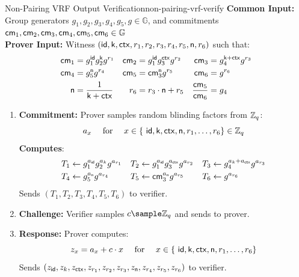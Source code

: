 \begin{protocol}{Non-Pairing VRF Output Verification}{non-pairing-vrf-verify}\label{pok-non-pairing-vrf}
\textbf{Common Input:} Group generators $g_1, g_2, g_3, g_4, g_5, g \in \mathbb{G}$, and commitments $\mathsf{cm}_1, \mathsf{cm}_2, \mathsf{cm}_3, \mathsf{cm}_4, \mathsf{cm}_5, \mathsf{cm}_6 \in \mathbb{G}$\\
\textbf{Prover Input:} Witness $(\mathsf{id}, \mathsf{k}, \mathsf{ctx}, r_1, r_2, r_3, r_4, r_5, \textsf{n}, r_6)$ such that:
    \begin{align*}
        \mathsf{cm}_1 &= g_1^{\mathsf{id}} g_2^{\mathsf{k}} g^{r_1}     &    \mathsf{cm}_2 &= g_1^{\mathsf{id}} g_3^{\mathsf{ctx}} g^{r_2}  &   \mathsf{cm}_3 &= g_4^{\mathsf{k} + \mathsf{ctx}} g^{r_3}\\
        \mathsf{cm}_4 &= g_5^{\textsf{n}} g^{r_4}   &   \mathsf{cm}_5 &= \mathsf{cm}_3^{\textsf{n}} g^{r_5}     &   \mathsf{cm}_6 &= g^{r_6} \\
        \textsf{n} &= \frac{1}{\mathsf{k} + \mathsf{ctx}}   &   r_6 &= r_3 \cdot \textsf{n} + r_5    &   \frac{\mathsf{cm}_5}{\mathsf{cm}_6} &= g_4
    \end{align*}

\begin{enumerate}
    \item \textbf{Commitment:} Prover samples random blinding factors from $\mathbb{Z}_q$:
    \[
        a_x \quad \text{ for } \quad x \in \{\ \mathsf{id}, \mathsf{k}, \mathsf{ctx}, \textsf{n}, r_1, \ldots,r_6\} \in \mathbb{Z}_q
    \]
    \textbf{Computes}:
    \begin{align*}
        T_1 &\gets g_1^{a_{\mathsf{id}}} g_2^{a_k} g^{a_{r_1}}  &   T_2 &\gets g_1^{a_{\mathsf{id}}} g_3^{a_{\mathsf{ctx}}} g^{a_{r_2}}     &   T_3 &\gets g_4^{a_k + a_{\mathsf{ctx}}} g^{a_{r_3}} \\
        T_4 &\gets g_5^{a_{\textsf{n}}} g^{a_{r_4}}   &   T_5 &\gets \mathsf{cm}_3^{a_{\textsf{n}}} g^{a_{r_5}}     &   T_6 &\gets g^{a_{r_6}}
    \end{align*}
    Sends $(T_1, T_2, T_3, T_4, T_5, T_6)$ to verifier.
    
    \item \textbf{Challenge:} Verifier samples $c \sample \mathbb{Z}_q$ and sends to prover.
    
    \item \textbf{Response:} Prover computes:
    \[
    z_x = a_x + c \cdot x \quad \text{ for } \quad x \in \{\ \mathsf{id}, \mathsf{k}, \mathsf{ctx}, \textsf{n}, r_1, \ldots,r_6\} 
    \]
    Sends $(z_{\mathsf{id}}, z_k, z_{\mathsf{ctx}}, z_{r_1}, z_{r_2}, z_{r_3}, z_{\textsf{n}}, z_{r_4}, z_{r_5}, z_{r_6})$ to verifier.
    

\end{enumerate}
\end{protocol}
